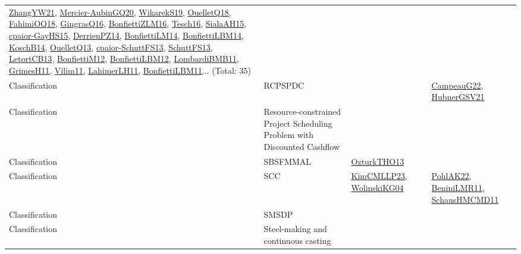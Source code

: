 {\begin{longtable}{lp{3cm}>{\raggedright}p{6cm}>{\raggedright}p{6cm}p{8cm}}
\href{articles/ZhangYW21.pdf}{ZhangYW21}\cite{ZhangYW21}, \href{papers/Mercier-AubinGQ20.pdf}{Mercier-AubinGQ20}\cite{Mercier-AubinGQ20}, \href{articles/WikarekS19.pdf}{WikarekS19}\cite{WikarekS19}, \href{papers/OuelletQ18.pdf}{OuelletQ18}\cite{OuelletQ18}, \href{articles/FahimiOQ18.pdf}{FahimiOQ18}\cite{FahimiOQ18}, \href{papers/GingrasQ16.pdf}{GingrasQ16}\cite{GingrasQ16}, \href{papers/BonfiettiZLM16.pdf}{BonfiettiZLM16}\cite{BonfiettiZLM16}, \href{papers/Tesch16.pdf}{Tesch16}\cite{Tesch16}, \href{papers/SialaAH15.pdf}{SialaAH15}\cite{SialaAH15}, \href{papers/cpaior-GayHS15.pdf}{cpaior-GayHS15}\cite{cpaior-GayHS15}, \href{papers/DerrienPZ14.pdf}{DerrienPZ14}\cite{DerrienPZ14}, \href{papers/BonfiettiLM14.pdf}{BonfiettiLM14}\cite{BonfiettiLM14}, \href{articles/BonfiettiLBM14.pdf}{BonfiettiLBM14}\cite{BonfiettiLBM14}, \href{papers/KoschB14.pdf}{KoschB14}\cite{KoschB14}, \href{papers/OuelletQ13.pdf}{OuelletQ13}\cite{OuelletQ13}, \href{papers/cpaior-SchuttFS13.pdf}{cpaior-SchuttFS13}\cite{cpaior-SchuttFS13}, \href{papers/SchuttFS13.pdf}{SchuttFS13}\cite{SchuttFS13}, \href{papers/LetortCB13.pdf}{LetortCB13}\cite{LetortCB13}, \href{papers/BonfiettiM12.pdf}{BonfiettiM12}\cite{BonfiettiM12}, \href{papers/BonfiettiLBM12.pdf}{BonfiettiLBM12}\cite{BonfiettiLBM12}, \href{papers/LombardiBMB11.pdf}{LombardiBMB11}\cite{LombardiBMB11}, \href{papers/GrimesH11.pdf}{GrimesH11}\cite{GrimesH11}, \href{papers/Vilim11.pdf}{Vilim11}\cite{Vilim11}, \href{papers/LahimerLH11.pdf}{LahimerLH11}\cite{LahimerLH11}, \href{papers/BonfiettiLBM11.pdf}{BonfiettiLBM11}\cite{BonfiettiLBM11}... (Total: 35)\\
Classification & RCPSPDC &  &  & \href{articles/CampeauG22.pdf}{CampeauG22}\cite{CampeauG22}, \href{articles/HubnerGSV21.pdf}{HubnerGSV21}\cite{HubnerGSV21}\\
Classification & Resource-constrained Project Scheduling Problem with Discounted Cashflow &  &  & \\
Classification & SBSFMMAL & \href{articles/OzturkTHO13.pdf}{OzturkTHO13}\cite{OzturkTHO13} &  & \\
Classification & SCC & \href{papers/KimCMLLP23.pdf}{KimCMLLP23}\cite{KimCMLLP23}, \href{papers/WolinskiKG04.pdf}{WolinskiKG04}\cite{WolinskiKG04} &  & \href{articles/PohlAK22.pdf}{PohlAK22}\cite{PohlAK22}, \href{articles/BeniniLMR11.pdf}{BeniniLMR11}\cite{BeniniLMR11}, \href{articles/SchausHMCMD11.pdf}{SchausHMCMD11}\cite{SchausHMCMD11}\\
Classification & SMSDP &  &  & \\
Classification & Steel-making and continuous casting &  &  & \\

\end{longtable}}
